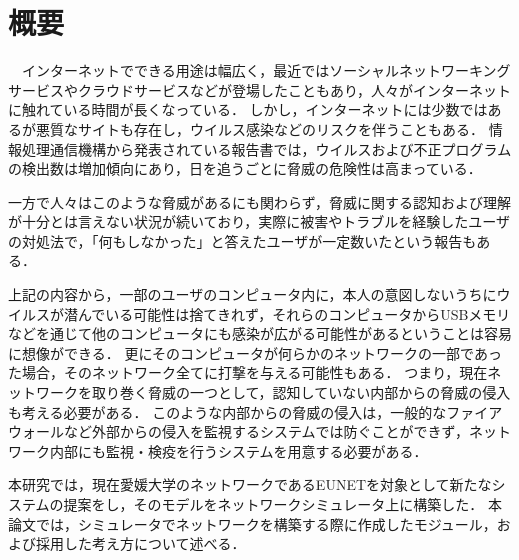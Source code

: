 \chapter*{概要}

　インターネットでできる用途は幅広く，最近ではソーシャルネットワーキングサービスやクラウドサービスなどが登場したこともあり，人々がインターネットに触れている時間が長くなっている．
しかし，インターネットには少数ではあるが悪質なサイトも存在し，ウイルス感染などのリスクを伴うこともある．
情報処理通信機構から発表されている報告書では，ウイルスおよび不正プログラムの検出数は増加傾向にあり\cite{joron2}，日を追うごとに脅威の危険性は高まっている．

一方で人々はこのような脅威があるにも関わらず，脅威に関する認知および理解が十分とは言えない状況が続いており，実際に被害やトラブルを経験したユーザの対処法で，「何もしなかった」と答えたユーザが一定数いたという報告もある\cite{joron1}．

上記の内容から，一部のユーザのコンピュータ内に，本人の意図しないうちにウイルスが潜んでいる可能性は捨てきれず，それらのコンピュータからUSBメモリなどを通じて他のコンピュータにも感染が広がる可能性があるということは容易に想像ができる．
更にそのコンピュータが何らかのネットワークの一部であった場合，そのネットワーク全てに打撃を与える可能性もある．
つまり，現在ネットワークを取り巻く脅威の一つとして，認知していない内部からの脅威の侵入も考える必要がある．
このような内部からの脅威の侵入は，一般的なファイアウォールなど外部からの侵入を監視するシステムでは防ぐことができず，ネットワーク内部にも監視・検疫を行うシステムを用意する必要がある．

本研究では，現在愛媛大学のネットワークであるEUNETを対象として新たなシステムの提案をし，そのモデルをネットワークシミュレータ上に構築した．
本論文では，シミュレータでネットワークを構築する際に作成したモジュール，および採用した考え方について述べる．